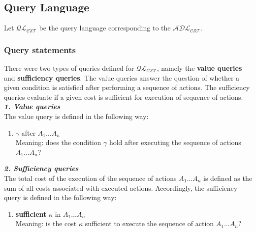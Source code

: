 \documentclass[a4paper]{article}
\begin{document}
\subsection{Query Language}
%
Let $\mathcal{QL_{CST}}$ be the query language corresponding to the $\mathcal{ADL_{CST}}$. 
%
\subsubsection{Query statements}
%
There were two types of queries defined for $\mathcal{QL_{CST}}$, namely the \textbf{value queries} and \textbf{sufficiency queries}. The value queries answer the question of whether a given condition is satisfied after performing a sequence of actions. The sufficiency queries evaluate if a given cost is sufficient for execution of sequence of actions.
\\[0.5\baselineskip]
\textbf{\textit{1. Value queries}}
\\[0.5\baselineskip]
The value query is defined in the following way:
\begin{enumerate}
    \item $\gamma$ after $A_1\dotsc A_n$ \\[0.5\baselineskip]
    Meaning: does the condition $\gamma$ hold after executing the sequence of actions $A_1\dotsc A_n$?
\end{enumerate}
\textbf{\textit{2. Sufficiency queries}}
\\[0.5\baselineskip]
The total cost of the execution of the sequence of actions $A_1\dotsc A_n$ is defined as the sum of all costs associated with executed actions. Accordingly, the sufficiency query is defined in the following way:
\begin{enumerate}
    \item \textbf{sufficient} $\kappa$ in $A_1\dotsc A_n$ \\[0.5\baselineskip]
    Meaning: is the cost $\kappa$ sufficient to execute the sequence of action $A_1\dotsc A_n$?
\end{enumerate}
\end{document}
